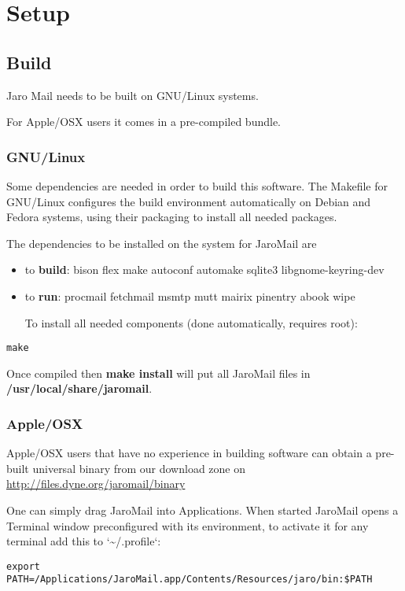 \documentclass[a4,onecolumn,portrait]{article}
\begin{document}
\section{Setup}
\label{sec-3}

\subsection{Build}
\label{sec-3-1}

Jaro Mail needs to be built on GNU/Linux systems.

For Apple/OSX users it comes in a pre-compiled bundle.

\subsubsection{GNU/Linux}
\label{sec-3-1-1}

Some dependencies are needed in order to build this software. The Makefile for GNU/Linux configures the build environment automatically on Debian and Fedora systems, using their packaging to install all needed packages.

The dependencies to be installed on the system for JaroMail are
\begin{itemize}
\item to \textbf{build}: bison flex make autoconf automake sqlite3 libgnome-keyring-dev
\item to \textbf{run}: procmail fetchmail msmtp mutt mairix pinentry abook wipe

To install all needed components (done automatically, requires root):
\end{itemize}

\begin{verbatim}
make
\end{verbatim}

Once compiled then \textbf{make install} will put all JaroMail files in \textbf{/usr/local/share/jaromail}.
\subsubsection{Apple/OSX}
\label{sec-3-1-2}

Apple/OSX users that have no experience in building software can obtain a pre-built universal binary from our download zone on \url{http://files.dyne.org/jaromail/binary}

One can simply drag JaroMail into Applications. When started JaroMail opens a Terminal window preconfigured with its environment, to activate it for any terminal add this to `\textasciitilde{}/.profile`:
\begin{verbatim}
export PATH=/Applications/JaroMail.app/Contents/Resources/jaro/bin:$PATH
\end{verbatim}
\end{document}
